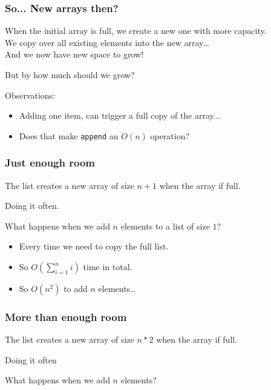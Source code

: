 \begin{frame}
	\frametitle{So... New arrays then?}
		When the initial array is full, we create a new one with more capacity.\\
		We copy over all existing elements into the new array\dots\\
		And we now have new space to grow!
	
		But by how much should we grow?	
	
	Observations:
		\begin{itemize}
			\item Adding one item, can trigger a full copy of the array...
			\item Does that make \texttt{append} an $O(n)$ operation?
		\end{itemize}
\end{frame}

\begin{frame}
	\frametitle{Just enough room}
		The list creates a new array of size $n+1$ when the array if full.
		
		Doing it often.
	
		What happens when we add $n$ elements to a list of size $1$?
		
		\begin{itemize}
			\item Every time we need to copy the full list.
			\item So $O(\sum\limits_{i=1}^{n}i)$ time in total.
			\item So $O(n^2)$ to add $n$ elements\dots
		\end{itemize}
\end{frame}

\begin{frame}
	\frametitle{More than enough room}
		The list creates a new array of size $n*2$ when the array if full.
		
		Doing it often
	
		What happens when we add $n$ elements?
\end{frame}

